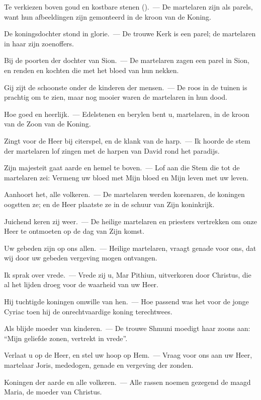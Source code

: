 \documentclass[12pt,twoside,a5paper]{article}
\begin{document}
\begin{halfparskip}
  Te verkiezen boven goud en kostbare stenen ().~--- De martelaren zijn als parels, want hun afbeeldingen zijn gemonteerd in de kroon van de Koning.

  De koningsdochter stond in glorie.~--- De trouwe Kerk is een parel; de martelaren in haar zijn zoenoffers.

  Bij de poorten der dochter van Sion.~--- De martelaren zagen een parel in Sion, en renden en kochten die met het bloed van hun nekken.

  Gij zijt de schoonste onder de kinderen der mensen.~--- De roos in de tuinen is prachtig om te zien, maar nog mooier waren de martelaren in hun dood.

  Hoe goed en heerlijk.~--- Edelstenen en berylen bent u, martelaren, in de kroon van de Zoon van de Koning.

  Zingt voor de Heer bij citerspel, en de klank van de harp.~--- Ik hoorde de stem der martelaren lof zingen met de harpen van David rond het paradijs.

  Zijn majesteit gaat aarde en hemel te boven.~--- Lof aan die Stem die tot de martelaren zei: Vermeng uw bloed met Mijn bloed en Mijn leven met uw leven.

  Aanhoort het, alle volkeren.~--- De martelaren werden korenaren, de koningen oogstten ze; en de Heer plaatste ze in de schuur van Zijn koninkrijk.

  Juichend keren zij weer.~--- De heilige martelaren en priesters vertrekken om onze Heer te ontmoeten op de dag van Zijn komst.

  Uw gebeden zijn op ons allen.~--- Heilige martelaren, vraagt genade voor ons, dat wij door uw gebeden vergeving mogen ontvangen.

  Ik sprak over vrede.~--- Vrede zij u, Mar Pithiun, uitverkoren door Christus, die al het lijden droeg voor de waarheid van uw Heer.

  Hij tuchtigde koningen omwille van hen.~--- Hoe passend was het voor de jonge Cyriac toen hij de onrechtvaardige koning terechtwees.

  Als blijde moeder van kinderen.~--- De trouwe Shmuni moedigt haar zoons aan: ``Mijn geliefde zonen, vertrekt in vrede''.

  Verlaat u op de Heer, en stel uw hoop op Hem.~--- Vraag voor ons aan uw Heer, martelaar Joris, mededogen, genade en vergeving der zonden.

  Koningen der aarde en alle volkeren.~--- Alle rassen noemen gezegend de maagd Maria, de moeder van Christus.


\end{halfparskip}
\end{document}
